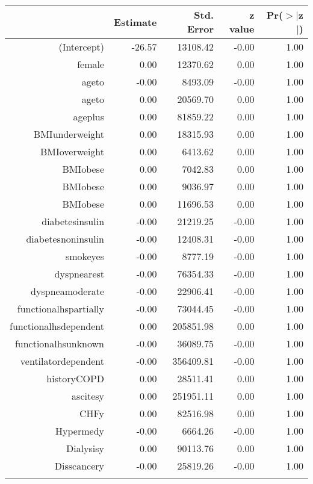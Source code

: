\bigskip\bigskip
\centering
\begin{tabular}{rrrrr}
  \hline
 & Estimate & Std. Error & z value & Pr($>$$|$z$|$) \\ 
  \hline
(Intercept) & -26.57 & 13108.42 & -0.00 & 1.00 \\ 
  female & 0.00 & 12370.62 & 0.00 & 1.00 \\ 
  age\-65\-to\-74 & -0.00 & 8493.09 & -0.00 & 1.00 \\ 
  age\-75\-to\-84 & 0.00 & 20569.70 & 0.00 & 1.00 \\ 
  age\-85\-plus & 0.00 & 81859.22 & 0.00 & 1.00 \\ 
  BMI\-underweight & 0.00 & 18315.93 & 0.00 & 1.00 \\ 
  BMI\-overweight & 0.00 & 6413.62 & 0.00 & 1.00 \\ 
  BMI\-obese\-1 & 0.00 & 7042.83 & 0.00 & 1.00 \\ 
  BMI\-obese\-2 & 0.00 & 9036.97 & 0.00 & 1.00 \\ 
  BMI\-obese\-3 & 0.00 & 11696.53 & 0.00 & 1.00 \\ 
  diabetes\-insulin & -0.00 & 21219.25 & -0.00 & 1.00 \\ 
  diabetes\-noninsulin & -0.00 & 12408.31 & -0.00 & 1.00 \\ 
  smoke\-yes & -0.00 & 8777.19 & -0.00 & 1.00 \\ 
  dyspnea\-rest & -0.00 & 76354.33 & -0.00 & 1.00 \\ 
  dyspnea\-moderate & -0.00 & 22906.41 & -0.00 & 1.00 \\ 
  functional\-hs\-partially & -0.00 & 73044.45 & -0.00 & 1.00 \\ 
  functional\-hs\-dependent & 0.00 & 205851.98 & 0.00 & 1.00 \\ 
  functional\-hs\-unknown & -0.00 & 36089.75 & -0.00 & 1.00 \\ 
  ventilator\-dependent & -0.00 & 356409.81 & -0.00 & 1.00 \\ 
  history\-COPD & 0.00 & 28511.41 & 0.00 & 1.00 \\ 
  ascites\-y & 0.00 & 251951.11 & 0.00 & 1.00 \\ 
  CHF\-y & 0.00 & 82516.98 & 0.00 & 1.00 \\ 
  Hyper\-med\-y & -0.00 & 6664.26 & -0.00 & 1.00 \\ 
  Dialysis\-y & 0.00 & 90113.76 & 0.00 & 1.00 \\ 
  Diss\-cancer\-y & -0.00 & 25819.26 & -0.00 & 1.00 \\ 
$$
\end{tabular}
